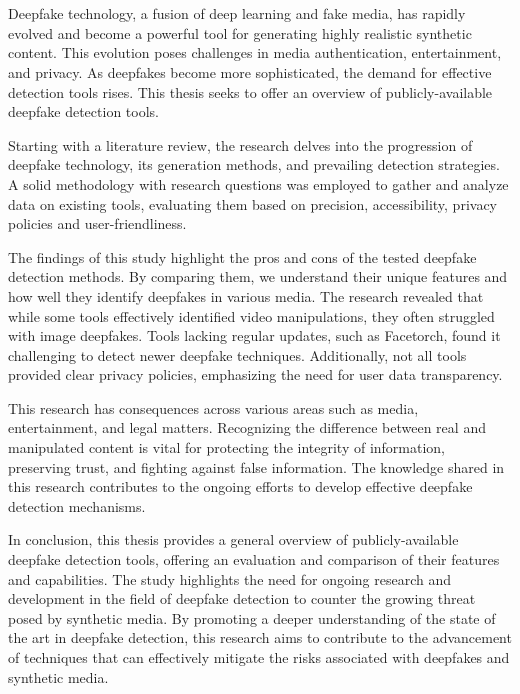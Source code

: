 \chapter{\abstractname}

Deepfake technology, a fusion of deep learning and fake media, has rapidly
evolved and become a powerful tool for generating highly realistic synthetic
content. This evolution poses challenges in media authentication, entertainment,
and privacy. As deepfakes become more sophisticated, the demand for effective
detection tools rises. This thesis seeks to offer an overview of publicly-available
deepfake detection tools.

Starting with a literature review, the research delves into the progression of
deepfake technology, its generation methods, and prevailing detection strategies.
A solid methodology with research questions was employed to gather and analyze
data on existing tools, evaluating them based on precision, accessibility, privacy
policies and user-friendliness.

The findings of this study highlight the pros and cons of the tested
deepfake detection methods. By comparing them, we understand their unique features
and how well they identify deepfakes in various media. The research revealed that
while some tools effectively identified video manipulations, they often struggled
with image deepfakes. Tools lacking regular updates, such as Facetorch, found it
challenging to detect newer deepfake techniques. Additionally, not all tools
provided clear privacy policies, emphasizing the need for user data transparency.

This research has consequences across various areas such as media, entertainment,
and legal matters. Recognizing the difference between real and manipulated content
is vital for protecting the integrity of information, preserving trust, and
fighting against false information. The knowledge shared in this research contributes
to the ongoing efforts to develop effective deepfake detection mechanisms.

In conclusion, this thesis provides a general overview of publicly-available
deepfake detection tools, offering an evaluation and comparison of their
features and capabilities. The study highlights the need for ongoing research and
development in the field of deepfake detection to counter the growing threat
posed by synthetic media. By promoting a deeper understanding of the state of
the art in deepfake detection, this research aims to contribute to the
advancement of techniques that can effectively mitigate the risks associated
with deepfakes and synthetic media.
